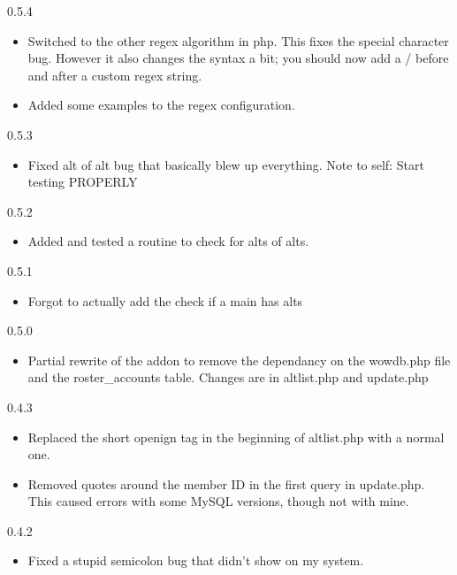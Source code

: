 \documentclass[12pt, a4paper]{article}
\begin{document}
\begin{description}
\item{0.5.4}
\begin{itemize}
\item Switched to the other regex algorithm in php. This fixes the special
   character bug. However it also changes the syntax a bit; you should now
   add a / before and after a custom regex string.
\item Added some examples to the regex configuration.
\end{itemize}

\item{0.5.3}
\begin{itemize}
\item Fixed alt of alt bug that basically blew up everything. Note to self: Start
   testing PROPERLY
\end{itemize}

\item{0.5.2}
\begin{itemize}
\item Added and tested a routine to check for alts of alts.
\end{itemize}

\item{0.5.1}
\begin{itemize}
\item Forgot to actually add the check if a main has alts
\end{itemize}

\item{0.5.0}
\begin{itemize}
\item Partial rewrite of the addon to remove the dependancy on the wowdb.php
   file and the roster\_accounts table. Changes are in altlist.php and update.php
\end{itemize}

\item{0.4.3}
\begin{itemize}
\item Replaced the short openign tag in the beginning of altlist.php with a normal
   one.
\item Removed quotes around the member ID in the first query in update.php. This
   caused errors with some MySQL versions, though not with mine.
\end{itemize}

\item{0.4.2}
\begin{itemize}
\item Fixed a stupid semicolon bug that didn't show on my system.
\end{itemize}


\end{description}
\end{document}
